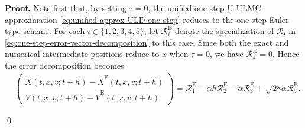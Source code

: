 \documentclass[12pt]{article}
\newenvironment{redtext}
  {\color{black}\ignorespaces}
  {\ignorespacesafterend}
\numberwithin{equation}{section}
\renewenvironment{proof}%
  {\begin{trivlist}%
   \item[]\ignorespaces}%
  {\qed\end{trivlist}}
\begin{document}
\begin{redtext}
\begin{proof}
\textbf{Proof.}
Note first that, by setting $\tau=0$, the unified one-step U-ULMC approximation \eqref{eq:unified-approx-ULD-one-step} reduces to the one-step Euler-type scheme.
For each $i\in\{1,2,3,4,5\}$, let $\mathcal R_i^{\mathrm E}$ denote
the specialization of $\mathcal R_i$ in
\eqref{eq:one-step-error-vector-decomposition} to this case.
Since both the exact and numerical intermediate positions reduce
to $x$ when $\tau=0$, we have $\mathcal R_4^{\mathrm E}=0$.
Hence the error decomposition becomes
\begin{align}
&
\left(
\begin{aligned}
X(t,x,v;t+h)-\bar X^{\mathrm E}(t,x,v;t+h)
\\
V(t,x,v;t+h)-\bar V^{\mathrm E}(t,x,v;t+h)
\end{aligned}
\right)
=
\mathcal R_1^{\mathrm E}
-\alpha h\mathcal R_2^{\mathrm E}
-\alpha\mathcal R_3^{\mathrm E}
+\sqrt{2\gamma\alpha}\mathcal R_5^{\mathrm E}.
\label{eq:Euler-error-decomposition}
\end{align}

\end{proof}
\end{redtext}
\end{document}
